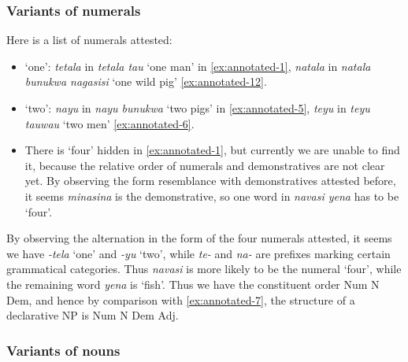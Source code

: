 \documentclass{article}
\newcommand*{\corpus}[1]{\emph{#1}}
\newcommand{\translate}[1]{`#1'}
\begin{document}
\subsubsection{Variants of numerals}

Here is a list of numerals attested:
\begin{itemize}
    \item \translate{one}: 
    \corpus{tetala} in \corpus{tetala tau} \translate{one man} in \eqref{ex:annotated-1},
    \corpus{natala} in \corpus{natala bunukwa nagasisi} \translate{one wild pig} \eqref{ex:annotated-12}.
    \item \translate{two}: 
    \corpus{nayu} in \corpus{nayu bunukwa} \translate{two pigs} in \eqref{ex:annotated-5},
    \corpus{teyu} in \corpus{teyu tauwau} \translate{two men} \eqref{ex:annotated-6}.
    \item There is \translate{four} hidden in \eqref{ex:annotated-1}, 
    but currently we are unable to find it,
    because the relative order of numerals and demonstratives are not clear yet.
    By observing the form resemblance with demonstratives attested before, 
    it seems \corpus{minasina} is the demonstrative,
    so one word in \corpus{navasi yena} has to be \translate{four}.
\end{itemize}

By observing the alternation in the form of the four numerals attested,
it seems we have \corpus{-tela} \translate{one} and \corpus{-yu} \translate{two},
while \corpus{te-} and \corpus{na-} are prefixes marking certain grammatical categories.
Thus \corpus{navasi} is more likely to be the numeral \translate{four}, \marginnote{\corpus{navasi}, \corpus{yena}}
while the remaining word \corpus{yena} is \translate{fish}. 
Thus we have the constituent order Num N Dem,
and hence by comparison with \eqref{ex:annotated-7},
the structure of a declarative NP is Num N Dem Adj. 

\subsubsection{Variants of nouns}\label{sec:varieties-of-nouns}
\end{document}

